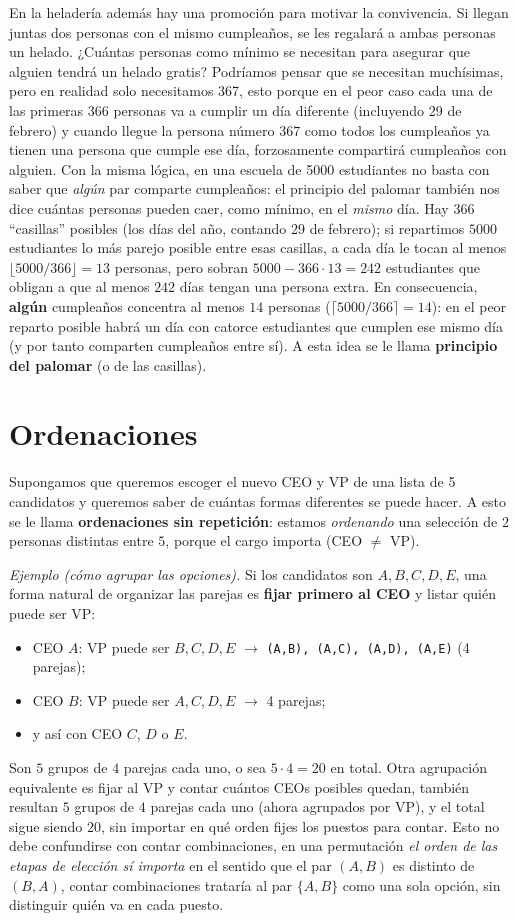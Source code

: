  En la heladería además hay una promoción para motivar la convivencia. Si llegan juntas dos personas con el mismo cumpleaños, se les regalará a ambas personas un helado. ¿Cuántas personas como mínimo se necesitan para asegurar que alguien tendrá un helado gratis? Podríamos pensar que se necesitan muchísimas, pero en realidad solo necesitamos 367, esto porque en el peor caso cada una de las primeras 366 personas va a cumplir un día diferente (incluyendo 29 de febrero) y cuando llegue la persona número 367 como todos los cumpleaños ya tienen una persona que cumple ese día, forzosamente compartirá cumpleaños con alguien. Con la misma lógica, en una escuela de 5000 estudiantes no basta con saber que \emph{algún} par comparte cumpleaños: el principio del palomar también nos dice cuántas personas pueden caer, como mínimo, en el \emph{mismo} día. Hay $366$ ``casillas'' posibles (los días del año, contando 29 de febrero); si repartimos $5000$ estudiantes lo más parejo posible entre esas casillas, a cada día le tocan al menos $\lfloor 5000/366\rfloor = 13$ personas, pero sobran $5000 - 366\cdot 13 = 242$ estudiantes que obligan a que al menos $242$ días tengan una persona extra. En consecuencia, \textbf{algún} cumpleaños concentra al menos $14$ personas ($\lceil 5000/366\rceil = 14$): en el peor reparto posible habrá un día con catorce estudiantes que cumplen ese mismo día (y por tanto comparten cumpleaños entre sí). A esta idea se le llama \textbf{principio del palomar} (o de las casillas).

\section{Ordenaciones}

Supongamos que queremos escoger el nuevo CEO y VP de una lista de 5 candidatos y queremos saber de cuántas formas diferentes se puede hacer. A esto se le llama \textbf{ordenaciones sin repetición}: estamos \emph{ordenando} una selección de $2$ personas distintas entre $5$, porque el cargo importa (CEO $\neq$ VP).

\textit{Ejemplo (cómo agrupar las opciones).} Si los candidatos son $A,B,C,D,E$, una forma natural de organizar las parejas es \textbf{fijar primero al CEO} y listar quién puede ser VP:
\begin{itemize}
  \item CEO $A$: VP puede ser $B,C,D,E$ $\to$ \texttt{(A,B), (A,C), (A,D), (A,E)} (4 parejas);
  \item CEO $B$: VP puede ser $A,C,D,E$ $\to$ 4 parejas;
  \item y así con CEO $C$, $D$ o $E$.
\end{itemize}
Son $5$ grupos de $4$ parejas cada uno, o sea $5\cdot 4 = 20$ en total. Otra agrupación equivalente es fijar al VP y contar cuántos CEOs posibles quedan, también resultan $5$ grupos de $4$ parejas cada uno (ahora agrupados por VP), y el total sigue siendo $20$, sin importar en qué orden fijes los puestos para contar. Esto no debe confundirse con contar combinaciones, en una permutación \emph{el orden de las etapas de elección sí importa} en el sentido que el par $(A,B)$ es distinto de $(B,A)$, contar combinaciones trataría al par $\{A,B\}$ como una sola opción, sin distinguir quién va en cada puesto.

